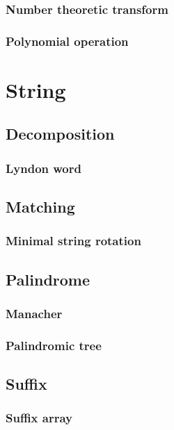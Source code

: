 \documentclass[titlepage,a4paper,10pt]{article}
\begin{document}
\begin{multicols}{2}
\begin{spacing}{0.8}
{				\subsubsection{Number theoretic transform}
					
				\subsubsection{Polynomial operation}
					
		\section{String}
			\subsection{Decomposition}
				\subsubsection{Lyndon word}
					
			\subsection{Matching}
				\subsubsection{Minimal string rotation}
					
			\subsection{Palindrome}
				\subsubsection{Manacher}
					
				\subsubsection{Palindromic tree}
					
			\subsection{Suffix}
				\subsubsection{Suffix array}
					
}
\end{spacing}
\end{multicols}
\end{document}
